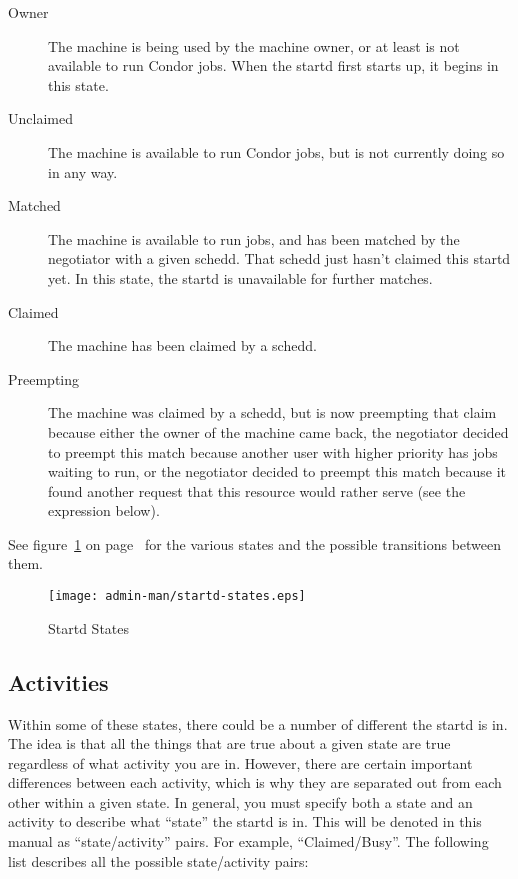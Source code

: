 \begin{description}
  
\item[Owner] The machine is being used by the machine owner, or at
  least is not available to run Condor jobs.  When the startd first
  starts up, it begins in this state.
  
\item[Unclaimed] The machine is available to run Condor jobs, but is
  not currently doing so in any way.
  
\item[Matched] The machine is available to run jobs, and has been
  matched by the negotiator with a given schedd.  That schedd just
  hasn't claimed this startd yet.  In this state, the startd is
  unavailable for further matches.

\item[Claimed] The machine has been claimed by a schedd. 
  
\item[Preempting] The machine was claimed by a schedd, but is now
  preempting that claim because either the owner of the machine came
  back, the negotiator decided to preempt this match because another
  user with higher priority has jobs waiting to run, or the negotiator
  decided to preempt this match because it found another request that
  this resource would rather serve (see the  expression
  below).

\end{description}

See figure~\ref{fig:startd-states} on page~\pageref{fig:startd-states}
for the various states and the possible transitions between them.

\begin{figure}[hbt]
\centering
\texttt{[image: admin-man/startd-states.eps]}
\caption{\label{fig:startd-states}Startd States}
\end{figure}

\subsection{ Activities}
\label{sec:Activities}

Within some of these states, there could be a number of different
 the startd is in.  The idea is that all the things
that are true about a given state are true regardless of what activity
you are in.  However, there are certain important differences between
each activity, which is why they are separated out from each other
within a given state.  In general, you must specify both a state and
an activity to describe what ``state'' the startd is in.  This will be
denoted in this manual as ``state/activity'' pairs.  For example,
``Claimed/Busy''.  The following list describes all the possible
state/activity pairs:

